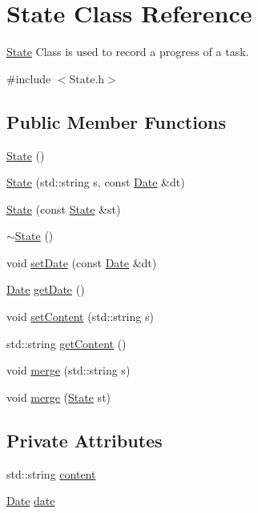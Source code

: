 \hypertarget{classState}{\section{State Class Reference}
\label{classState}
}


\hyperlink{classState}{State} Class is used to record a progress of a task.  




{\ttfamily \#include $<$State.\-h$>$}

\subsection*{Public Member Functions}
\begin{DoxyCompactItemize}
\item 
\hyperlink{classState_ab91bb1dd5aa6260ab2a456581daf9ec2}{State} ()
\item 
\hyperlink{classState_acc328bb9bcea278074ba7dd8f4fd669d}{State} (std\-::string s, const \hyperlink{classDate}{Date} \&dt)
\item 
\hyperlink{classState_a893ddf069c68f0b3b0b019f56787f6c5}{State} (const \hyperlink{classState}{State} \&st)
\item 
\hyperlink{classState_afab438d92b90dc18d194dbd9c9c8bab3}{$\sim$\-State} ()
\item 
void \hyperlink{classState_ab13c5851bcdbbe40b8b56397aca753bc}{set\-Date} (const \hyperlink{classDate}{Date} \&dt)
\item 
\hyperlink{classDate}{Date} \hyperlink{classState_a3664da3a20958900365cdd76658e6d4a}{get\-Date} ()
\item 
void \hyperlink{classState_aa8d9dbc292caef3a38ebd7460a4d00a5}{set\-Content} (std\-::string s)
\item 
std\-::string \hyperlink{classState_a8718dda1c97b278380d14f686d85116f}{get\-Content} ()
\item 
void \hyperlink{classState_a61aee26c30eed819471404242b392518}{merge} (std\-::string s)
\item 
void \hyperlink{classState_aa8e95f73956f3ffbea5e1d5076df32e8}{merge} (\hyperlink{classState}{State} st)
\end{DoxyCompactItemize}
\subsection*{Private Attributes}
\begin{DoxyCompactItemize}
\item 
std\-::string \hyperlink{classState_a571e4d3107736dc2074ab985cff9ad20}{content}
\item 
\hyperlink{classDate}{Date} \hyperlink{classState_aa84f5430996a657c5658791b556fb8db}{date}
\end{DoxyCompactItemize}


